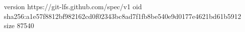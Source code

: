version https://git-lfs.github.com/spec/v1
oid sha256:a1e57f8812bf982162cd0f02343bc8ad7f1fb8be540e9d0177e4621bd61b5912
size 87540
